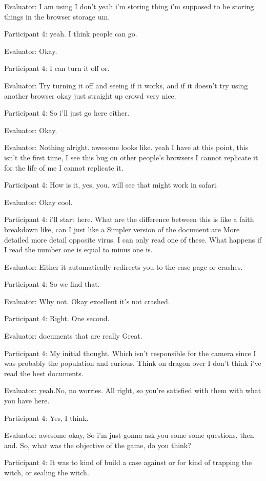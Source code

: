 \documentclass{l4proj}
\begin{document}
\begin{appendices}
Evaluator: I am using I don't yeah i'm storing thing i'm supposed to be storing things in the browser storage um.

Participant 4: yeah. I think people can go.

Evaluator: Okay.

Participant 4: I can turn it off or.

Evaluator: Try turning it off and seeing if it works, and if it doesn't try using another browser okay just straight up crowd very nice.

Participant 4: So i'll just go here either.

Evaluator: Okay.

Evaluator: Nothing alright. awesome looks like. yeah I have at this point, this isn't the first time, I see this bug on other people's browsers I cannot replicate it for the life of me I cannot replicate it.

Participant 4: How is it, yes, you. will see that might work in safari.

Evaluator: Okay cool.

Participant 4: i'll start here. What are the difference between this is like a faith breakdown like, can I just like a Simpler version of the document are More detailed more detail opposite virus. I can only read one of these. What happens if I read the number one is equal to minus one is.

Evaluator: Either it automatically redirects you to the case page or crashes.

Participant 4: So we find that.

Evaluator: Why not. Okay excellent it's not crashed.

Participant 4: Right. One second.

Evaluator: documents that are really Great.

Participant 4: My initial thought. Which isn't responsible for the camera since I was probably the population and curious. Think on dragon over I don't think i've read the best documents.

Evaluator: yeah.No, no worries. All right, so you're satisfied with them with what you have here.

Participant 4: Yes, I think.

Evaluator: awesome okay, So i'm just gonna ask you some some questions, then and. So, what was the objective of the game, do you think?

Participant 4: It was to kind of build a case against or for kind of trapping the witch, or sealing the witch.


\end{appendices}
\end{document}
